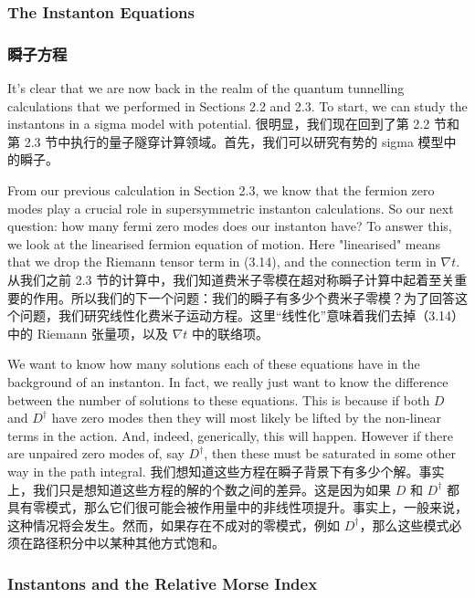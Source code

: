 \documentclass{article}
\begin{document}
\begin{paracol}{2}
\subsubsection*{The Instanton Equations}
\switchcolumn
\subsubsection*{瞬子方程}
\switchcolumn*

It’s clear that we are now back in the realm of the quantum tunnelling calculations that we performed in Sections 2.2 and 2.3. To start, we can study the instantons in a sigma model with potential.
\switchcolumn
很明显，我们现在回到了第 2.2 节和第 2.3 节中执行的量子隧穿计算领域。首先，我们可以研究有势的 sigma 模型中的瞬子。
\switchcolumn*

From our previous calculation in Section 2.3, we know that the fermion zero modes play a crucial role in supersymmetric instanton calculations. So our next question: how many fermi zero modes does our instanton have? To answer this, we look at the linearised fermion equation of motion. Here "linearised" means that we drop the Riemann tensor term in (3.14), and the connection term in $\nabla t$.
\switchcolumn
从我们之前 2.3 节的计算中，我们知道费米子零模在超对称瞬子计算中起着至关重要的作用。所以我们的下一个问题：我们的瞬子有多少个费米子零模？为了回答这个问题，我们研究线性化费米子运动方程。这里“线性化”意味着我们去掉（3.14）中的 Riemann 张量项，以及 $\nabla t$ 中的联络项。
\switchcolumn*

We want to know how many solutions each of these equations have in the background of an instanton. In fact, we really just want to know the difference between the number of solutions to these equations. This is because if both $D$ and $D^{\dagger}$ have zero modes then they will most likely be lifted by the non-linear terms in the action. And, indeed, generically, this will happen. However if there are unpaired zero modes of, say $D^{\dagger}$, then these must be saturated in some other way in the path integral.
\switchcolumn
我们想知道这些方程在瞬子背景下有多少个解。事实上，我们只是想知道这些方程的解的个数之间的差异。这是因为如果 $D$ 和 $D^{\dagger}$ 都具有零模式，那么它们很可能会被作用量中的非线性项提升。事实上，一般来说，这种情况将会发生。然而，如果存在不成对的零模式，例如 $D^{\dagger}$，那么这些模式必须在路径积分中以某种其他方式饱和。
\switchcolumn*

\subsubsection*{Instantons and the Relative Morse Index}
\switchcolumn

\end{paracol}
\end{document}
